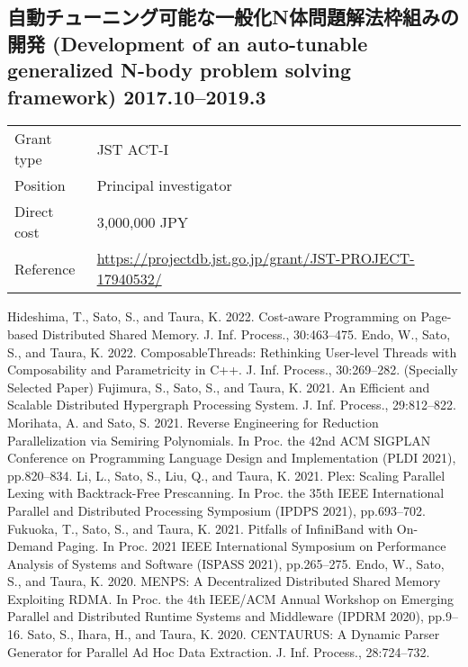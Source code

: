 \documentclass[a4paper,dvipdfmx]{article}
\newcommand{\datedsubsection}[2]{%
  \subsection[#1]{#1 \hfill #2}%
}
\begin{document}
\datedsubsection{自動チューニング可能な一般化N体問題解法枠組みの開発
(Development of an auto-tunable generalized N-body problem solving framework)}{2017.10--2019.3}
\begin{flushleft}
\begin{tabular}[t]{ll}
Grant type & JST ACT-I \\
Position  & Principal investigator \\
Direct cost & 3,000,000 JPY \\
Reference & \url{https://projectdb.jst.go.jp/grant/JST-PROJECT-17940532/} \\
\end{tabular}
\end{flushleft}

\newpage
\renewcommand{\refname}{Publications (Refereed)}
\begin{thebibliography}{100}
  Hideshima, T., Sato, S., and Taura, K. 2022. Cost-aware Programming on Page-based Distributed Shared Memory. J. Inf. Process., 30:463–475.
  Endo, W., Sato, S., and Taura, K. 2022. ComposableThreads: Rethinking User-level Threads with Composability and Parametricity in C++. J. Inf. Process., 30:269–282. (Specially Selected Paper)
  Fujimura, S., Sato, S., and Taura, K. 2021. An Efficient and Scalable Distributed Hypergraph Processing System. J. Inf. Process., 29:812–822.
  Morihata, A. and Sato, S. 2021. Reverse Engineering for Reduction Parallelization via Semiring Polynomials. In Proc. the 42nd ACM SIGPLAN Conference on Programming Language Design and Implementation (PLDI 2021), pp.820–834.
  Li, L., Sato, S., Liu, Q., and Taura, K. 2021. Plex: Scaling Parallel Lexing with Backtrack-Free Prescanning. In Proc. the 35th IEEE International Parallel and Distributed Processing Symposium (IPDPS 2021), pp.693–702.
  Fukuoka, T., Sato, S., and Taura, K. 2021. Pitfalls of InfiniBand with On-Demand Paging. In Proc. 2021 IEEE International Symposium on Performance Analysis of Systems and Software (ISPASS 2021), pp.265–275.
  Endo, W., Sato, S., and Taura, K. 2020. MENPS: A Decentralized Distributed Shared Memory Exploiting RDMA. In Proc. the 4th IEEE/ACM Annual Workshop on Emerging Parallel and Distributed Runtime Systems and Middleware (IPDRM 2020), pp.9–16.
  Sato, S., Ihara, H., and Taura, K. 2020. CENTAURUS: A Dynamic Parser Generator for Parallel Ad Hoc Data Extraction. J. Inf. Process., 28:724–732.

\end{thebibliography}
\end{document}
